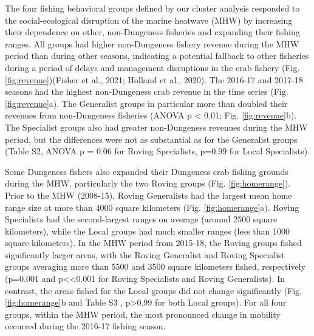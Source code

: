 \documentclass[]{elsarticle} %
\begin{document}
The four fishing behavioral groups defined by our cluster analysis
responded to the social-ecological disruption of the marine heatwave
(MHW) by increasing their dependence on other, non-Dungeness fisheries
and expanding their fishing ranges. All groups had higher non-Dungeness
fishery revenue during the MHW period than during other seasons,
indicating a potential fallback to other fisheries during a period of
delays and management disruptions in the crab fishery (Fig.
\ref{fig:revenue})(Fisher et al., 2021; Holland et al., 2020). The
2016-17 and 2017-18 seasons had the highest non-Dungeness crab revenue
in the time series (Fig. \ref{fig:revenue}a). The Generalist groups in
particular more than doubled their revenues from non-Dungeness fisheries
(ANOVA p \textless{} 0.01; Fig. \ref{fig:revenue}b). The Specialist
groups also had greater non-Dungeness revenues during the MHW period,
but the differences were not as substantial as for the Generalist groups
(Table S2, ANOVA p = 0.06 for Roving Specialists, p=0.99 for Local
Specialists).

Some Dungeness fishers also expanded their Dungeness crab fishing
grounds during the MHW, particularly the two Roving groups (Fig.
\ref{fig:homerange}). Prior to the MHW (2008-15), Roving Generalists had
the largest mean home range size at more than 4000 square kilometers
(Fig. \ref{fig:homerange}a). Roving Specialists had the second-largest
ranges on average (around 2500 square kilometers), while the Local
groups had much smaller ranges (less than 1000 square kilometers). In
the MHW period from 2015-18, the Roving groups fished significantly
larger areas, with the Roving Generalist and Roving Specialist groups
averaging more than 5500 and 3500 square kilometers fished, respectively
(p=0.001 and p\textless\textless0.001 for Roving Specialists and Roving
Generalists). In contrast, the areas fished for the Local groups did not
change significantly (Fig. \ref{fig:homerange}b and Table S3 ,
p\textgreater0.99 for both Local groups). For all four groups, within
the MHW period, the most pronounced change in mobility occurred during
the 2016-17 fishing season.
\end{document}
